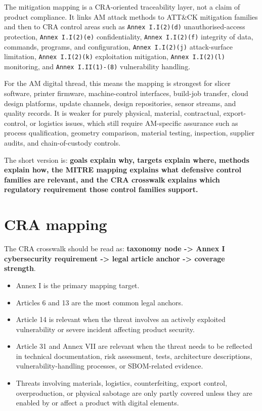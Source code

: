 \documentclass[10pt,a4paper,oneside]{report}
\begin{document}
The mitigation mapping is a CRA-oriented traceability layer, not a claim of product compliance. It links AM attack methods to ATT\&CK mitigation families and then to CRA control areas such as \texttt{Annex I.I(2)(d)} unauthorised-access protection, \texttt{Annex I.I(2)(e)} confidentiality, \texttt{Annex I.I(2)(f)} integrity of data, commands, programs, and configuration, \texttt{Annex I.I(2)(j)} attack-surface limitation, \texttt{Annex I.I(2)(k)} exploitation mitigation, \texttt{Annex I.I(2)(l)} monitoring, and \texttt{Annex I.II(1)-(8)} vulnerability handling.

For the AM digital thread, this means the mapping is strongest for slicer software, printer firmware, machine-control interfaces, build-job transfer, cloud design platforms, update channels, design repositories, sensor streams, and quality records. It is weaker for purely physical, material, contractual, export-control, or logistics issues, which still require AM-specific assurance such as process qualification, geometry comparison, material testing, inspection, supplier audits, and chain-of-custody controls.

The short version is: \textbf{goals explain why, targets explain where, methods explain how, the MITRE mapping explains what defensive control families are relevant, and the CRA crosswalk explains which regulatory requirement those control families support.}


\section{CRA mapping}


The CRA crosswalk should be read as: \textbf{taxonomy node -> Annex I cybersecurity requirement -> legal article anchor -> coverage strength}.

\begin{itemize}
\item Annex I is the primary mapping target.
\item Articles 6 and 13 are the most common legal anchors.
\item Article 14 is relevant when the threat involves an actively exploited vulnerability or severe incident affecting product security.
\item Article 31 and Annex VII are relevant when the threat needs to be reflected in technical documentation, risk assessment, tests, architecture descriptions, vulnerability-handling processes, or SBOM-related evidence.
\item Threats involving materials, logistics, counterfeiting, export control, overproduction, or physical sabotage are only partly covered unless they are enabled by or affect a product with digital elements.
\end{itemize}
\end{document}
